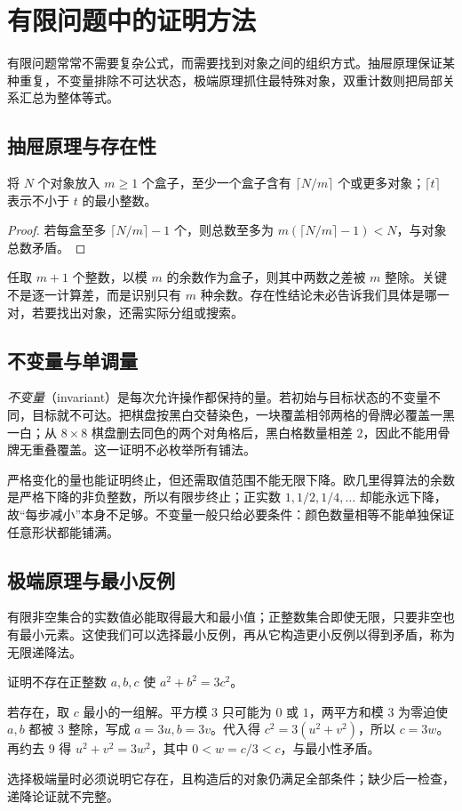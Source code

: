 \setcounter{chapter}{11} %
\chapter{有限问题中的证明方法}
\label{chap:em-discrete}
有限问题常常不需要复杂公式，而需要找到对象之间的组织方式。抽屉原理保证某种重复，不变量排除不可达状态，极端原理抓住最特殊对象，双重计数则把局部关系汇总为整体等式。

\section{抽屉原理与存在性}
\begin{theorem}[抽屉原理]
将 $N$ 个对象放入 $m\ge1$ 个盒子，至少一个盒子含有 $\lceil N/m\rceil$ 个或更多对象；$\lceil t\rceil$ 表示不小于 $t$ 的最小整数。
\end{theorem}
\begin{proof}
若每盒至多 $\lceil N/m\rceil-1$ 个，则总数至多为 $m(\lceil N/m\rceil-1)<N$，与对象总数矛盾。
\end{proof}
任取 $m+1$ 个整数，以模 $m$ 的余数作为盒子，则其中两数之差被 $m$ 整除。关键不是逐一计算差，而是识别只有 $m$ 种余数。存在性结论未必告诉我们具体是哪一对，若要找出对象，还需实际分组或搜索。

\section{不变量与单调量}
\emph{不变量}（invariant）是每次允许操作都保持的量。若初始与目标状态的不变量不同，目标就不可达。把棋盘按黑白交替染色，一块覆盖相邻两格的骨牌必覆盖一黑一白；从 $8\times8$ 棋盘删去同色的两个对角格后，黑白格数量相差 $2$，因此不能用骨牌无重叠覆盖。这一证明不必枚举所有铺法。

严格变化的量也能证明终止，但还需取值范围不能无限下降。欧几里得算法的余数是严格下降的非负整数，所以有限步终止；正实数 $1,1/2,1/4,\ldots$ 却能永远下降，故“每步减小”本身不足够。不变量一般只给必要条件：颜色数量相等不能单独保证任意形状都能铺满。

\section{极端原理与最小反例}
有限非空集合的实数值必能取得最大和最小值；正整数集合即使无限，只要非空也有最小元素。这使我们可以选择最小反例，再从它构造更小反例以得到矛盾，称为无限递降法。

\begin{example}
证明不存在正整数 $a,b,c$ 使 $a^2+b^2=3c^2$。
\end{example}
\begin{solve}
若存在，取 $c$ 最小的一组解。平方模 $3$ 只可能为 $0$ 或 $1$，两平方和模 $3$ 为零迫使 $a,b$ 都被 $3$ 整除，写成 $a=3u,b=3v$。代入得 $c^2=3(u^2+v^2)$，所以 $c=3w$。再约去 $9$ 得 $u^2+v^2=3w^2$，其中 $0<w=c/3<c$，与最小性矛盾。
\end{solve}
选择极端量时必须说明它存在，且构造后的对象仍满足全部条件；缺少后一检查，递降论证就不完整。


